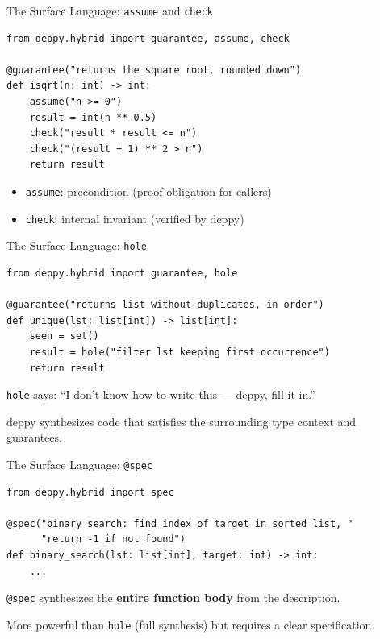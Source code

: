\documentclass[aspectratio=169,11pt]{beamer}
\begin{document}
\begin{frame}{The Surface Language: \texttt{assume} and \texttt{check}}
\begin{lstlisting}[language=deppy]
from deppy.hybrid import guarantee, assume, check

@guarantee("returns the square root, rounded down")
def isqrt(n: int) -> int:
    assume("n >= 0")
    result = int(n ** 0.5)
    check("result * result <= n")
    check("(result + 1) ** 2 > n")
    return result
\end{lstlisting}

\vspace{0.3em}
\begin{itemize}
\item \texttt{assume}: precondition (proof obligation for callers)
\item \texttt{check}: internal invariant (verified by deppy)
\end{itemize}
\end{frame}

\begin{frame}{The Surface Language: \texttt{hole}}
\begin{lstlisting}[language=deppy]
from deppy.hybrid import guarantee, hole

@guarantee("returns list without duplicates, in order")
def unique(lst: list[int]) -> list[int]:
    seen = set()
    result = hole("filter lst keeping first occurrence")
    return result
\end{lstlisting}

\vspace{0.5em}
\texttt{hole} says: ``I don't know how to write this --- deppy, fill it in.''

\vspace{0.3em}
deppy synthesizes code that satisfies the surrounding type context and guarantees.
\end{frame}

\begin{frame}{The Surface Language: \texttt{@spec}}
\begin{lstlisting}[language=deppy]
from deppy.hybrid import spec

@spec("binary search: find index of target in sorted list, "
      "return -1 if not found")
def binary_search(lst: list[int], target: int) -> int:
    ...
\end{lstlisting}

\vspace{0.5em}
\texttt{@spec} synthesizes the \textbf{entire function body} from the description.

\vspace{0.3em}
More powerful than \texttt{hole} (full synthesis) but requires a clear specification.
\end{frame}
\end{document}
